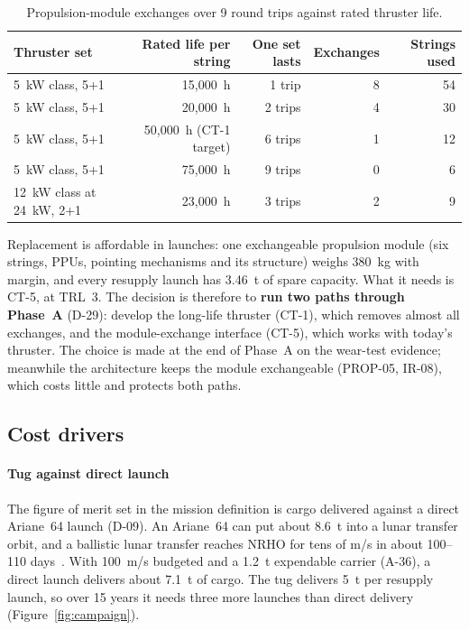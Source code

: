 \documentclass[11pt,a4paper]{article}
\newcommand{\figsrc}[1]{\par\vspace{2pt}{\raggedright\footnotesize #1\par}}
\newcommand{\id}[1]{#1}
\begin{document}
\begin{table}[htbp]\centering\small
\caption{Propulsion-module exchanges over 9 round trips against rated thruster life.}\label{tab:life}
\begin{tabular}{@{}lrrrr@{}}
\toprule
Thruster set & Rated life per string & One set lasts & Exchanges & Strings used \\
\midrule
5~kW class, 5+1 & 15,000~h & 1 trip & 8 & 54 \\
5~kW class, 5+1 & 20,000~h & 2 trips & 4 & 30 \\
5~kW class, 5+1 & 50,000~h (CT-1 target) & 6 trips & 1 & 12 \\
5~kW class, 5+1 & 75,000~h & 9 trips & 0 & 6 \\
12~kW class at 24~kW, 2+1 & 23,000~h & 3 trips & 2 & 9 \\
\bottomrule
\end{tabular}
\figsrc{The 12~kW class is a US product, in conflict with European sourcing (\id{SR-24}).}
\end{table}

Replacement is affordable in launches: one exchangeable propulsion module (six strings, PPUs, pointing mechanisms and its structure) weighs 380~kg with margin, and every resupply launch has 3.46~t of spare capacity. What it needs is \id{CT-5}, at TRL~3. The decision is therefore to \textbf{run two paths through Phase~A} (\id{D-29}): develop the long-life thruster (\id{CT-1}), which removes almost all exchanges, and the module-exchange interface (\id{CT-5}), which works with today's thruster. The choice is made at the end of Phase~A on the wear-test evidence; meanwhile the architecture keeps the module exchangeable (\id{PROP-05}, \id{IR-08}), which costs little and protects both paths.

\subsection{Cost drivers}

\paragraph{Tug against direct launch} The figure of merit set in the mission definition is cargo delivered against a direct Ariane~64 launch (\id{D-09}). An Ariane~64 can put about 8.6~t into a lunar transfer orbit, and a ballistic lunar transfer reaches NRHO for tens of m/s in about 100--110 days~\cite{parrish}. With 100~m/s budgeted and a 1.2~t expendable carrier (\id{A-36}), a direct launch delivers about 7.1~t of cargo. The tug delivers 5~t per resupply launch, so over 15 years it needs three more launches than direct delivery (Figure~\ref{fig:campaign}).
\end{document}
